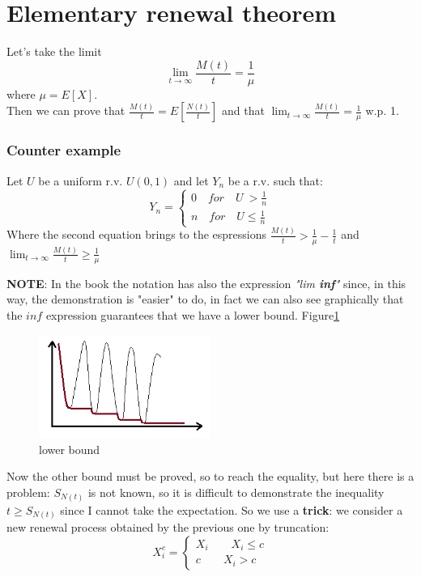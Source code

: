 \documentclass[a4paper, 12pt, openright]{book}
\theoremstyle{theoremdd}
\theoremstyle{remark}
\def \beq {\begin{equation}}
\def\eeq{\end{equation}}
\begin{document}
\section{Elementary renewal theorem}
Let's take the limit
\beq
\lim_{t \to \infty}\frac{M(t)}{t} = \frac{1}{\mu}
\eeq
where $\mu = E[X]$.\\
Then we can prove that $\frac{M(t)}{t} = E[\frac{N(t)}{t}]$ and that $\lim_{t \to \infty}\frac{M(t)}{t} = \frac{1}{\mu}$ w.p. 1.
\subsubsection{Counter example} 
Let $U$ be a uniform r.v. $U(0,1)$ and let $Y_n$ be a r.v. such that:
\beq
Y_n =
\begin{cases}
0 \quad for \quad U \ > \frac{1}{n}\\
n \quad for \quad U \leq \frac{1}{n}
\end{cases}
\eeq
Where the second equation brings to the espressions $\frac{M(t)}{t} > \frac{1}{\mu} - \frac{1}{t}$ and $\lim_{t \to \infty} \frac{M(t)}{t} \geq \frac{1}{\mu}$

\textbf{NOTE}: In the book the notation has also the expression \textit{"lim \textbf{inf}"} since, in this way, the demonstration is "easier" to do, in fact we can also see graphically that the $inf$ expression guarantees that we have a lower bound. Figure\ref{fig:graph1}
\begin{figure}[h]
\centering
\includegraphics[width=0.5\textwidth]{Cri_graph1.jpg}
\caption{lower bound}
\label{fig:graph1}
\end{figure}
Now the other bound must be proved, so to reach the equality, but here there is a problem: $S_{N(t)}$ is not known, so it is difficult to demonstrate the inequality $t \geq S_{N(t)}$ since I cannot take the expectation. So we use a \textbf{trick}: we consider a new renewal process obtained by the previous one by truncation:
\begin{equation}
X_i^c =
\begin{cases}
X_i \qquad X_i \leq c\\
c \qquad X_i >c
\end{cases}
\end{equation}
\end{document}
